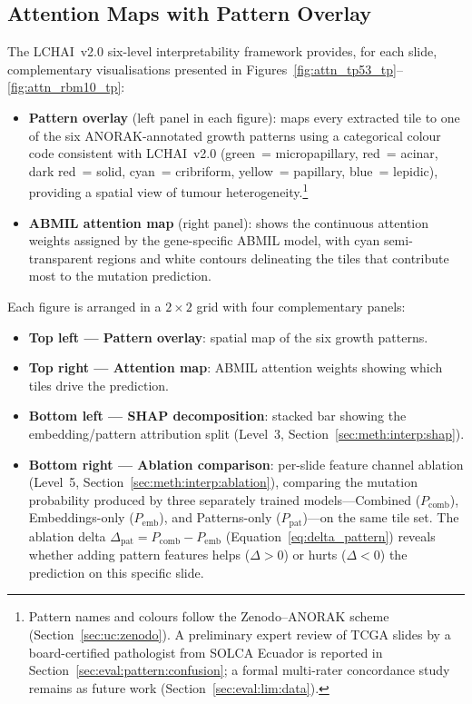 \subsection{Attention Maps with Pattern Overlay}
\label{sec:eval:interp:attention}

The LCHAI~v2.0 six-level interpretability framework provides, for each
slide, complementary visualisations presented
in Figures~\ref{fig:attn_tp53_tp}--\ref{fig:attn_rbm10_tp}:

\begin{itemize}
    \item \textbf{Pattern overlay} (left panel in each figure): maps
    every extracted tile to one of the six ANORAK-annotated growth patterns using a
    categorical colour code consistent with LCHAI~v2.0 (green~= micropapillary,
    red~= acinar, dark red~= solid, cyan~= cribriform, yellow~= papillary,
    blue~= lepidic), providing a spatial view of tumour heterogeneity.\footnote{Pattern names and colours follow the Zenodo--ANORAK scheme (Section~\ref{sec:uc:zenodo}). A preliminary expert review of TCGA slides by a board-certified pathologist from SOLCA Ecuador is reported in Section~\ref{sec:eval:pattern:confusion}; a formal multi-rater concordance study remains as future work (Section~\ref{sec:eval:lim:data}).}

    \item \textbf{ABMIL attention map} (right panel): shows the
    continuous attention weights assigned by the gene-specific ABMIL
    model, with cyan semi-transparent regions and white contours
    delineating the tiles that contribute most to the mutation
    prediction.
\end{itemize}

Each figure is arranged in a $2 \times 2$ grid with four
complementary panels:

\begin{itemize}
    \item \textbf{Top left --- Pattern overlay}: spatial map of the six
    growth patterns.
    \item \textbf{Top right --- Attention map}: ABMIL attention weights
    showing which tiles drive the prediction.
    \item \textbf{Bottom left --- SHAP decomposition}: stacked bar
    showing the embedding/pattern attribution split (Level~3,
    Section~\ref{sec:meth:interp:shap}).
    \item \textbf{Bottom right --- Ablation comparison}: per-slide
    feature channel ablation (Level~5,
    Section~\ref{sec:meth:interp:ablation}), comparing the mutation
    probability produced by three separately trained models---Combined
    ($P_{\text{comb}}$), Embeddings-only ($P_{\text{emb}}$), and
    Patterns-only ($P_{\text{pat}}$)---on the same tile set.
    The ablation delta $\Delta_{\text{pat}} = P_{\text{comb}} -
    P_{\text{emb}}$ (Equation~\ref{eq:delta_pattern}) reveals whether
    adding pattern features helps ($\Delta > 0$) or hurts
    ($\Delta < 0$) the prediction on this specific slide.
\end{itemize}

